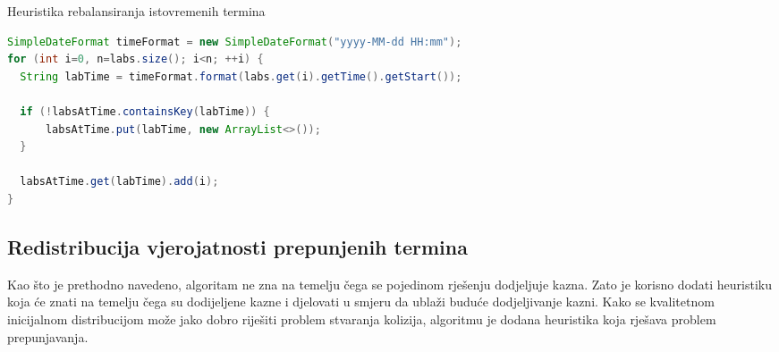 \documentclass[times, utf8, zavrsni]{fer}
\begin{document}
\begin{algorithm}
  \caption{Heuristika rebalansiranja istovremenih termina}
  \label{algo:rebalans}
  \begin{algorithmic}



      \ENDFOR


      \ENDFOR
    \ENDFOR
  \ENDFOR

  \end{algorithmic}
\end{algorithm}



\begin{lstlisting}[caption={Izrada mape istovremenih termina u programskom jeziku Java},label=code:labsAtTime, language=Java]
SimpleDateFormat timeFormat = new SimpleDateFormat("yyyy-MM-dd HH:mm");
for (int i=0, n=labs.size(); i<n; ++i) {
  String labTime = timeFormat.format(labs.get(i).getTime().getStart());

  if (!labsAtTime.containsKey(labTime)) {
      labsAtTime.put(labTime, new ArrayList<>());
  }

  labsAtTime.get(labTime).add(i);
}
\end{lstlisting}



\subsection{Redistribucija vjerojatnosti prepunjenih termina}
\label{sec:redistribucija}
Kao što je prethodno navedeno, algoritam ne zna na temelju čega se pojedinom rješenju dodjeljuje kazna. Zato je korisno dodati
heuristiku koja će znati na temelju čega su dodijeljene kazne i djelovati u smjeru da ublaži buduće dodjeljivanje kazni.
Kako se kvalitetnom inicijalnom distribucijom može jako dobro riješiti problem stvaranja kolizija, algoritmu je dodana heuristika
koja rješava problem prepunjavanja.
\end{document}
